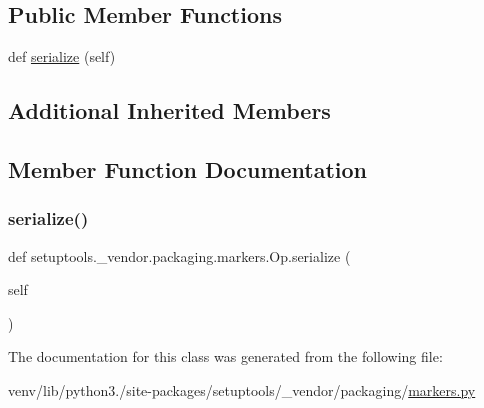 \subsection*{Public Member Functions}
\begin{DoxyCompactItemize}
\item 
def \hyperlink{classsetuptools_1_1__vendor_1_1packaging_1_1markers_1_1Op_a2b9bf4d54dce3f2385f816aebb1bd263}{serialize} (self)
\end{DoxyCompactItemize}
\subsection*{Additional Inherited Members}


\subsection{Member Function Documentation}
\mbox{\label{classsetuptools_1_1__vendor_1_1packaging_1_1markers_1_1Op_a2b9bf4d54dce3f2385f816aebb1bd263}} 
\subsubsection{\texorpdfstring{serialize()}{serialize()}}
{\footnotesize\ttfamily def setuptools.\+\_\+vendor.\+packaging.\+markers.\+Op.\+serialize (\begin{DoxyParamCaption}\item[{}]{self }\end{DoxyParamCaption})}



The documentation for this class was generated from the following file\+:\begin{DoxyCompactItemize}
\item 
venv/lib/python3./site-\/packages/setuptools/\+\_\+vendor/packaging/\hyperlink{setuptools_2__vendor_2packaging_2markers_8py}{markers.\+py}\end{DoxyCompactItemize}
